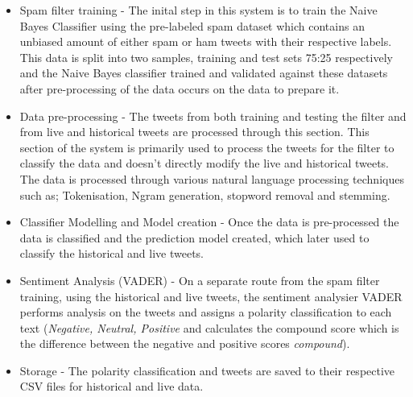 \documentclass[oneside, 10pt]{article}
\begin{document}
		\begin{itemize}
			\item Spam filter training - The inital step in this system is to train the Naive Bayes Classifier using the pre-labeled spam dataset which contains an unbiased amount of either spam or ham tweets with their respective labels.
			\subitem This data is split into two samples, training and test sets 75:25 respectively and the Naive Bayes classifier trained and validated against these datasets after pre-processing of the data occurs on the data to prepare it.
			\item Data pre-processing - The tweets from both training and testing the filter and from live and historical tweets are processed through this section. 
			\subitem This section of the system is primarily used to process the tweets for the filter to classify the data and doesn't directly modify the live and historical tweets. The data is processed through various natural language processing techniques such as; Tokenisation, Ngram generation, stopword removal and stemming.
			\item Classifier Modelling and Model creation - Once the data is pre-processed the data is classified and the prediction model created, which later used to classify the historical and live tweets.
			\item Sentiment Analysis (VADER) - On a separate route from the spam filter training, using the historical and live tweets, the sentiment analysier VADER performs analysis on the tweets and assigns a polarity classification to each text (\textit{Negative, Neutral, Positive} and calculates the compound score which is the difference between the negative and positive scores \textit{compound}).
			\item Storage - The polarity classification and tweets are saved to their respective CSV files for historical and live data.
		\end{itemize}
	
\end{document}
